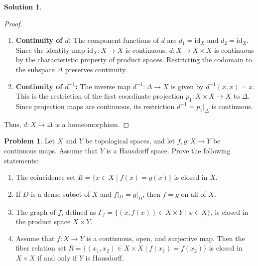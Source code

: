 \documentclass[11pt, a4paper]{article}
\theoremstyle{definition}
\newtheorem{problem}{Problem}
\newtheorem*{solution}{Solution}
\begin{document}
\begin{solution}
\begin{proof}
\begin{enumerate}[label=\arabic*.]
    \item \textbf{Continuity of $d$:}
    The component functions of $d$ are $d_1 = \text{id}_X$ and $d_2 = \text{id}_X$. Since the identity map $\text{id}_X : X \to X$ is continuous, $d : X \to X \times X$ is continuous by the characteristic property of product spaces. Restricting the codomain to the subspace $\Delta$ preserves continuity.

    \item \textbf{Continuity of $d^{-1}$:}
    The inverse map $d^{-1} : \Delta \to X$ is given by $d^{-1}(x,x) = x$. This is the restriction of the first coordinate projection $p_1 : X \times X \to X$ to $\Delta$. Since projection maps are continuous, its restriction $d^{-1} = p_1|_\Delta$ is continuous.
\end{enumerate}
Thus, $d : X \to \Delta$ is a homeomorphism.
\end{proof}
\end{solution}

\vspace{1em}

\begin{problem}
Let $X$ and $Y$ be topological spaces, and let $f, g : X \to Y$ be continuous maps. Assume that $Y$ is a Hausdorff space. Prove the following statements:
\begin{enumerate}[label=(\roman*)]
    \item The coincidence set $E = \{x \in X \mid f(x) = g(x)\}$ is closed in $X$.
    \item If $D$ is a dense subset of $X$ and $f|_D = g|_D$, then $f = g$ on all of $X$.
    \item The graph of $f$, defined as $\Gamma_f = \{(x, f(x)) \in X \times Y \mid x \in X\}$, is closed in the product space $X \times Y$.
    \item Assume that $f : X \to Y$ is a continuous, open, and surjective map. Then the fiber relation set $R = \{(x_1, x_2) \in X \times X \mid f(x_1) = f(x_2)\}$ is closed in $X \times X$ if and only if $Y$ is Hausdorff.
\end{enumerate}
\end{problem}
\end{document}
